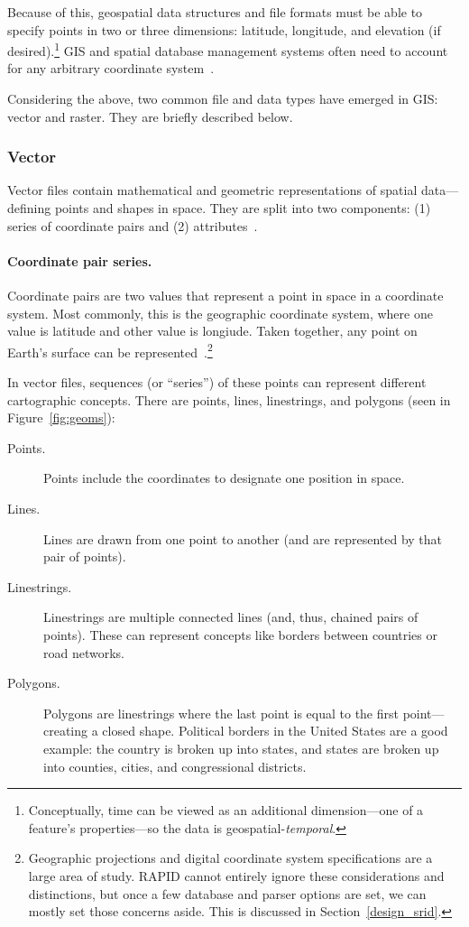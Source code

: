 Because of this, geospatial data structures and file formats must be able to specify points in two or three dimensions: latitude, longitude, and elevation (if desired).\footnote{Conceptually, time can be viewed as an additional dimension---one of a feature's properties---so the data is geospatial-\textit{temporal}.} GIS and spatial database management systems often need to account for any arbitrary coordinate system~\cite{gentle_intro}.

Considering the above, two common file and data types have emerged in GIS: vector and raster. They are briefly described below.

\subsubsection{Vector}
\label{sec:vector}
Vector files contain mathematical and geometric representations of spatial data---defining points and shapes in space. They are split into two components: (1) series of coordinate pairs and (2) attributes~\cite{gentle_intro}.

\paragraph{Coordinate pair series.}
Coordinate pairs are two values that represent a point in space in a coordinate system. Most commonly, this is the geographic coordinate system, where one value is latitude and other value is longiude. Taken together, any point on Earth's surface can be represented~\cite{gentle_intro}.\footnote{Geographic projections and digital coordinate system specifications are a large area of study. RAPID cannot entirely ignore these considerations and distinctions, but once a few database and parser options are set, we can mostly set those concerns aside. This is discussed in Section~\ref{design_srid}.}

In vector files, sequences (or ``series'') of these points can represent different cartographic concepts. There are points, lines, linestrings, and polygons (seen in Figure~\ref{fig:geoms}):

\begin{description}
  \item[Points.] Points include the coordinates to designate one position in space.
  \item[Lines.] Lines are drawn from one point to another (and are represented by that pair of points).
  \item[Linestrings.] Linestrings are multiple connected lines (and, thus, chained pairs of points). These can represent concepts like borders between countries or road networks.
  \item[Polygons.] Polygons are linestrings where the last point is equal to the first point---creating a closed shape. Political borders in the United States are a good example: the country is broken up into states, and states are broken up into counties, cities, and congressional districts.
\end{description}


